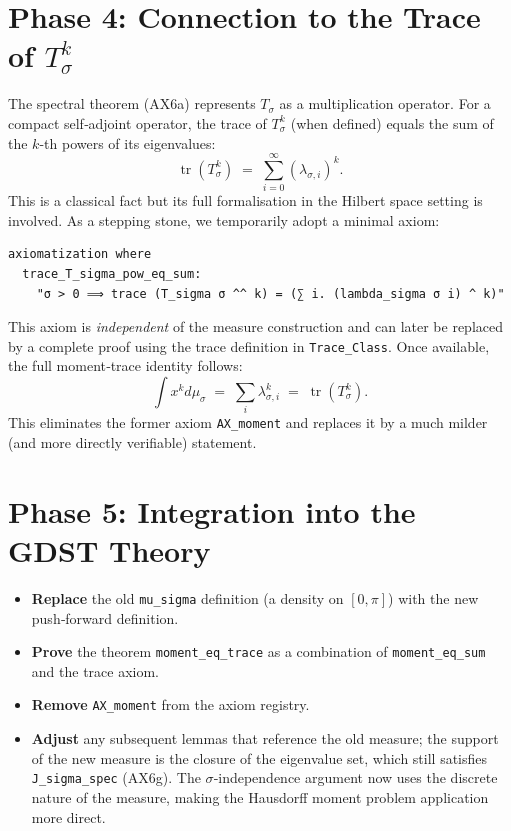 \documentclass[12pt,a4paper]{article}
\begin{document}
\section{Phase 4: Connection to the Trace of $T_\sigma^k$}
The spectral theorem (AX6a) represents $T_\sigma$ as a multiplication operator.  For a 
compact self‑adjoint operator, the trace of $T_\sigma^k$ (when defined) equals the sum of the 
$k$-th powers of its eigenvalues:
\[
\operatorname{tr}(T_\sigma^k) \;=\; \sum_{i=0}^\infty (\lambda_{\sigma,i})^k .
\]
This is a classical fact but its full formalisation in the Hilbert space setting is involved.  
As a stepping stone, we temporarily adopt a minimal axiom:
\begin{verbatim}
axiomatization where
  trace_T_sigma_pow_eq_sum:
    "σ > 0 ⟹ trace (T_sigma σ ^^ k) = (∑ i. (lambda_sigma σ i) ^ k)"
\end{verbatim}
This axiom is \emph{independent} of the measure construction and can later be replaced by a 
complete proof using the trace definition in \texttt{Trace\_Class}.  Once available, the 
full moment‑trace identity follows:
\[
\int x^k d\mu_\sigma \;=\; \sum_i \lambda_{\sigma,i}^k \;=\; \operatorname{tr}(T_\sigma^k).
\]
This eliminates the former axiom \texttt{AX\_moment} and replaces it by a much milder (and 
more directly verifiable) statement.

\section{Phase 5: Integration into the GDST Theory}
\begin{itemize}[leftmargin=*]
    \item \textbf{Replace} the old \texttt{mu\_sigma} definition (a density on $[0,\pi]$) 
          with the new push‑forward definition.
    \item \textbf{Prove} the theorem \texttt{moment\_eq\_trace} as a combination of 
          \texttt{moment\_eq\_sum} and the trace axiom.
    \item \textbf{Remove} \texttt{AX\_moment} from the axiom registry.
    \item \textbf{Adjust} any subsequent lemmas that reference the old measure; the support 
          of the new measure is the closure of the eigenvalue set, which still satisfies 
          \texttt{J\_sigma\_spec} (AX6g). The $\sigma$‑independence argument now uses 
          the discrete nature of the measure, making the Hausdorff moment problem 
          application more direct.
\end{itemize}
\end{document}
